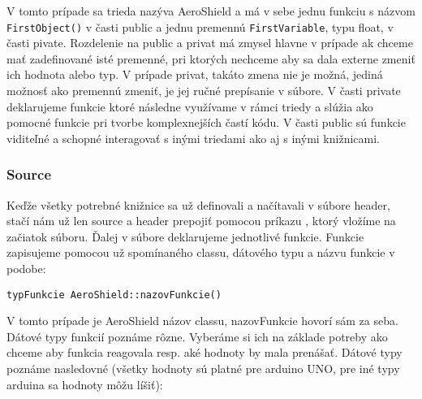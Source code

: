 V tomto prípade sa trieda nazýva AeroShield a má v sebe jednu funkciu s názvom \verb|FirstObject()| v časti public a jednu premennú \verb|FirstVariable|, typu float, v časti pivate. Rozdelenie na public a privat má zmysel hlavne v prípade ak chceme mať zadefinované isté premenné, pri ktorých nechceme aby sa dala externe zmeniť ich hodnota alebo typ. V prípade privat, takáto zmena nie je možná, jediná možnosť ako premennú zmeniť, je jej ručné prepísanie v súbore. V časti private deklarujeme funkcie ktoré následne využívame v rámci triedy a slúžia ako pomocné funkcie pri tvorbe komplexnejších častí kódu. V časti public sú funkcie viditeľné a schopné interagovať s inými triedami ako aj s inými knižnicami. 

\newpage
\subsubsection{Source}

Keďže všetky potrebné knižnice sa už definovali a načítavali v súbore header, stačí nám už len source a header prepojiť pomocou príkazu , ktorý vložíme na začiatok súboru. Ďalej v súbore deklarujeme jednotlivé funkcie. Funkcie zapisujeme pomocou už spomínaného classu, dátového typu a názvu funkcie v podobe:
\begin{lstlisting}[caption={Source volanie funkcie.},captionpos=b]
typFunkcie AeroShield::nazovFunkcie()
\end{lstlisting}
V tomto prípade je AeroShield názov classu, nazovFunkcie hovorí sám za seba. Dátové typy funkcií poznáme rôzne. Vyberáme si ich na základe potreby ako chceme aby funkcia reagovala resp. aké hodnoty by mala prenášať. Dátové typy poznáme nasledovné\cite{datovetypy} (všetky hodnoty sú platné pre arduino UNO, pre iné typy arduina sa hodnoty môžu líšiť): 

